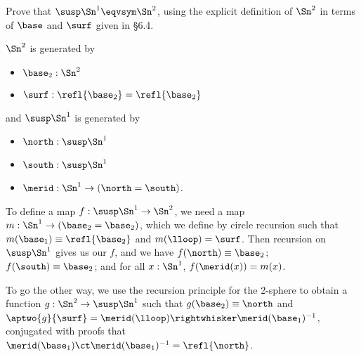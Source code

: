 \begin{coqdoccode}
\coqdocemptyline
\end{coqdoccode}
Prove that $\susp\Sn^{1} \eqvsym \Sn^{2}$, using the explicit definition of
$\Sn^{2}$ in terms of $\base$ and $\surf$ given in \S6.4.


 \soln
$\Sn^{2}$ is generated by



\begin{itemize}
\item  $\base_{2} : \Sn^{2}$

\item  $\surf : \refl{\base_{2}} = \refl{\base_{2}}$

\end{itemize}
and $\susp\Sn^{1}$ is generated by



\begin{itemize}
\item  $\north : \susp\Sn^{1}$

\item  $\south : \susp\Sn^{1}$

\item  $\merid : \Sn^{1} \to (\north = \south)$.

\end{itemize}
To define a map $f : \susp\Sn^{1} \to \Sn^{2}$, we need a map $m : \Sn^{1} \to
(\base_{2} = \base_{2})$, which we define by circle recursion such that
$m(\base_{1}) \equiv \refl{\base_{2}}$ and $m(\lloop) = \surf$.  Then recursion
on $\susp\Sn^{1}$ gives us our $f$, and we have $f(\north) \equiv \base_{2}$;
$f(\south) \equiv \base_{2}$; and for all $x : \Sn^{1}$, $f(\merid(x)) = m(x)$.


To go the other way, we use the recursion principle for the 2-sphere to obtain
a function $g : \Sn^{2} \to \susp\Sn^{1}$ such that $g(\base_{2}) \equiv
\north$ and $\aptwo{g}{\surf} = \merid(\lloop) \rightwhisker \merid(\base_{1})^{-1}$,
conjugated with proofs that $\merid(\base_{1}) \ct \merid(\base_{1})^{-1} =
\refl{\north}$.


